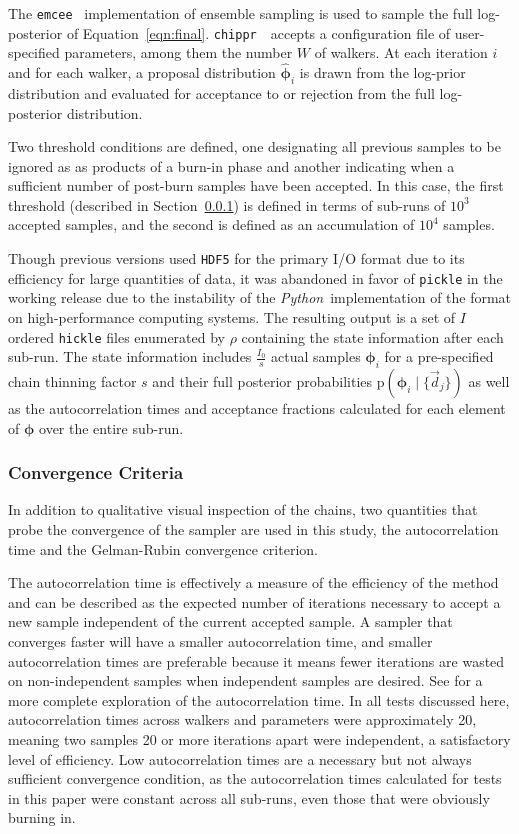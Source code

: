 \documentclass[iop]{emulateapj}
\newcommand{\Sect}[1]{Section~\ref{#1}}
\newcommand{\Eq}[1]{Equation~\ref{#1}}
\newcommand{\repo}[1]{{\texttt{#1}}~}
\newcommand{\chippr}{\repo{chippr}}
\newcommand{\emcee}{\repo{emcee}}
\newcommand{\python}{\textit{Python}}
\newcommand{\data}{\ensuremath{\vec{d}}}
\newcommand{\pr}[1]{\ensuremath{\mathrm{p}(#1)}}
\newcommand{\gvn}{\mid}%
\newcommand{\bvec}[1]{{\ensuremath{\boldsymbol{#1}}}}
\newcommand{\ndphi}{\bvec{\phi}}
\begin{document}
The \emcee \citep{Foreman-Mackey2013} implementation of ensemble sampling is 
used to sample the full log-posterior of \Eq{eqn:final}. 
\chippr\ accepts a configuration file of user-specified parameters, among them 
the number $W$ of walkers.
At each iteration $i$ and for each walker, a proposal distribution 
$\hat{\ndphi}_{i}$ is drawn from the log-prior distribution and evaluated for 
acceptance to or rejection from the full log-posterior distribution.

Two threshold conditions are defined, one designating all previous samples to 
be ignored as as products of a burn-in phase and another indicating when a 
sufficient number of post-burn samples have been accepted.  
In this case, the first threshold (described in \Sect{sec:acorr}) is defined in 
terms of sub-runs of $10^{3}$ accepted samples, and the second is defined as an 
accumulation of $10^{4}$ samples.

Though previous versions used \texttt{HDF5} for the primary I/O format due to 
its efficiency for large quantities of data, it was abandoned in favor of 
\texttt{pickle} in the working release due to the instability of the \python\ 
implementation of the format on high-performance computing systems.  
The resulting output is a set of $I$ ordered \texttt{hickle} files enumerated 
by $\rho$ containing the state information after each sub-run.  
The state information includes $\frac{I_{0}}{s}$ actual samples $\ndphi_{i}$ 
for a pre-specified chain thinning factor $s$ and their full posterior 
probabilities $\pr{\ndphi_{i} \gvn \{\data_{j}\}}$ as well as the 
autocorrelation times and acceptance fractions calculated for each element of 
$\ndphi$ over the entire sub-run.  

\subsubsection{Convergence Criteria}
\label{sec:acorr}

In addition to qualitative visual inspection of the chains, two quantities that 
probe the convergence of the sampler are used in this study, the 
autocorrelation time and the Gelman-Rubin convergence criterion.  


The autocorrelation time is effectively a measure of the efficiency of the 
method and can be described as the expected number of iterations necessary to 
accept a new sample independent of the current accepted sample.  
A sampler that converges faster will have a smaller autocorrelation time, and 
smaller autocorrelation times are preferable because it means fewer iterations 
are wasted on non-independent samples when independent samples are desired.  
See \citet{Foreman-Mackey2013} for a more complete exploration of the 
autocorrelation time.  
In all tests discussed here, autocorrelation times across walkers and 
parameters were approximately 20, meaning two samples 20 or more iterations 
apart were independent, a satisfactory level of efficiency.  
Low autocorrelation times are a necessary but not always sufficient convergence 
condition, as the autocorrelation times calculated for tests in this paper were 
constant across all sub-runs, even those that were obviously burning in.  
\end{document}
